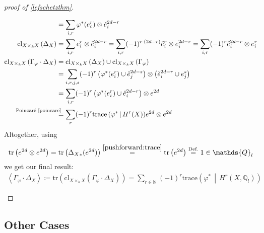 \documentclass[english]{scrartcl}
\theoremstyle{definition}
\theoremstyle{remark}
\newcommand*{\N}{\mathds{N}}
\newcommand*{\Z}{\mathds{Z}}
\newcommand*{\Q}{\mathds{Q}}
\newcommand*{\Zl}{\Z_l} %
\newcommand*{\Ql}{\Q_l} %
\newcommand*{\tr}[1]{\text{tr}\left(#1\right)} %
\newcommand*{\intProd}[2]{{#1\cdot#2}} %
\newcommand*{\intNum}[1]{{\left\langle{#1}\right\rangle}} %
\newcommand*{\Graph}[1]{{\Gamma_{#1}}} %
\newcommand*{\Diag}[1]{{\Delta_{#1}}} %
\newcommand*{\trace}[2]{{\text{trace}\left(#1 \,\middle|\, #2 \right)}} %
\newcommand*{\cl}[2]{{\text{cl}_{#1}\left(#2\right)}} %
\renewcommand*{\phi}{\varphi}
\newcommand*{\Poincare}{{\text{Poincaré \ref{poincare}}}}
\begin{document}
\begin{proof}[proof of \autoref{lefschetzthm}]
\begin{enumerate}[label={Step \arabic*.}]
\begin{align*}
      &= \sum_{i,r} \phi^*(e_i^r)\otimes \check e_i^{2d-r}\\
      \cl{X\times_k X}{\Diag{X}}
      &= \sum_{i,r} e_i^r\otimes \check e_i^{2d-r} =
        \sum_{i,r} (-1)^{r\cdot (2d-r)}\check e_i^r\otimes e_i^{2d-r} =
        \sum_{i,r} (-1)^{r}\check e_i^{2d-r}\otimes e_i^r\\
      \cl{X\times_k X}{\intProd{\Graph{\phi}}{\Diag{X}}}
      &= \cl{X\times_k X}{\Diag{X}} \cup \cl{X\times_k X}{\Graph{\phi}}\\
      &= \sum_{i,r,j,s} (-1)^{r}
        \left(\phi^*(e_i^r)\cup \check e_j^{2d-s}\right)
        \otimes \left(\check e_i^{2d-r}\cup e_j^s\right)\\
      &= \sum_{i,r} (-1)^{r}
        \left(\phi^*(e_i^r)\cup \check e_i^{2d-r}\right)
        \otimes e^{2d}\\
      &\overset{\mathllap{\Poincare}}=
        \sum_{r} (-1)^r \trace{\phi^*}{H^r(X)} e^{2d} \otimes e^{2d}
    \end{align*}
    Altogether, using
    \begin{align*}
      \tr{e^{2d} \otimes e^{2d}}
      = \tr{\Diag{X}_*(e^{2d})}
      \overset{\eqref{pushforward:trace}}= \tr{e^{2d}}
      \overset{\text{Def.}}= 1\in\Ql
    \end{align*}
    we get our final result:
    \begin{gather*}
      \intNum{\intProd{\Graph\phi}{\Diag X}} \coloneqq
      \tr{\cl{X\times_kX}{\intProd{\Graph\phi}{\Diag X}}}
      = \sum_{r\in\N} (-1)^r \trace{\phi^*}{H^r(X,\Ql)}
    \end{gather*}
  \end{enumerate}
\end{proof}

\subsection{Other Cases}

\nocite{*}
\printbibliography
\end{document}
